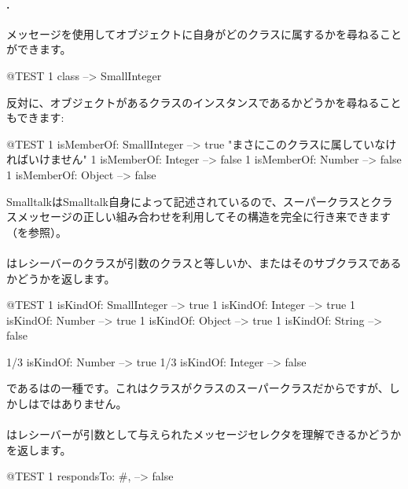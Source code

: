 \documentclass[a4paper,10pt,twoside]{book}
\begin{document}
\paragraph{.} メッセージを使用してオブジェクトに自身がどのクラスに属するかを尋ねることができます。
\begin{code}{@TEST}
1 class --> SmallInteger
\end{code}

反対に、オブジェクトがあるクラスのインスタンスであるかどうかを尋ねることもできます:
\begin{code}{@TEST}
1 isMemberOf: SmallInteger --> true    "まさにこのクラスに属していなければいけません"
1 isMemberOf: Integer          --> false
1 isMemberOf: Number        --> false
1 isMemberOf: Object           --> false
\end{code}

SmalltalkはSmalltalk自身によって記述されているので、スーパークラスとクラスメッセージの正しい組み合わせを利用してその構造を完全に行き来できます（を参照）。

\paragraph{}
はレシーバーのクラスが引数のクラスと等しいか、またはそのサブクラスであるかどうかを返します。

\begin{code}{@TEST}
1 isKindOf: SmallInteger --> true
1 isKindOf: Integer          --> true
1 isKindOf: Number         --> true
1 isKindOf: Object           --> true
1 isKindOf: String            --> false

1/3 isKindOf: Number      --> true
1/3 isKindOf: Integer        --> false
\end{code}

であるはの一種です。これはクラスがクラスのスーパークラスだからですが、しかしはではありません。

\paragraph{}
はレシーバーが引数として与えられたメッセージセレクタを理解できるかどうかを返します。

\begin{code}{@TEST}
1 respondsTo: #, --> false
\end{code}
\end{document}
